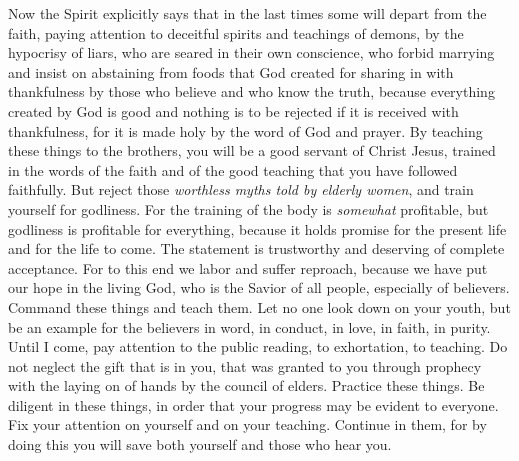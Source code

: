 \begin{biblechapter} %
 Now the Spirit explicitly says that in the last times some will depart from the faith, paying attention to deceitful spirits and teachings of demons,
\verse by the hypocrisy of liars, who are seared in their own conscience,
\verse who forbid marrying and insist on abstaining from foods that God created for sharing in with thankfulness by those who believe and who know the truth,
\verse because everything created by God is good and nothing is to be rejected if it is received with thankfulness,
\verse for it is made holy by the word of God and prayer.
 By teaching these things to the brothers, you will be a good servant of Christ Jesus, trained in the words of the faith and of the good teaching that you have followed faithfully.
\verse But reject those \textit{worthless myths told by elderly women}, and train yourself for godliness.
\verse For the training of the body is \textit{somewhat} profitable, but godliness is profitable for everything, because it holds promise for the present life and for the life to come.
\verse The statement is trustworthy and deserving of complete acceptance.
\verse For to this end we labor and suffer reproach, because we have put our hope in the living God, who is the Savior of all people, especially of believers.
\verse Command these things and teach them.
\verse Let no one look down on your youth, but be an example for the believers in word, in conduct, in love, in faith, in purity.
\verse Until I come, pay attention to the public reading, to exhortation, to teaching.
\verse Do not neglect the gift that is in you, that was granted to you through prophecy with the laying on of hands by the council of elders.
\verse Practice these things. Be diligent in these things, in order that your progress may be evident to everyone.
\verse Fix your attention on yourself and on your teaching. Continue in them, for by doing this you will save both yourself and those who hear you.
\end{biblechapter}

